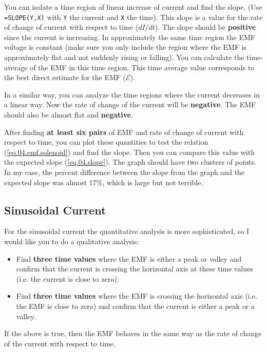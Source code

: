 You can isolate a time region of linear increase of current and find the slope. (Use \texttt{=SLOPE(Y,X)} with \texttt{Y} the current and \texttt{X} the time). This slope is a value for the rate of change of current with respect to time ($dI/dt$). The slope should be \textbf{positive} since the current is increasing. In approximately the same time region the EMF voltage is constant (make sure you only include the region where the EMF is approximately flat and not suddenly rising or falling). You can calculate the time-average of the EMF in this time region. This time average value corresponds to the best direct estimate for the EMF ($\mathcal{E}$).

In a similar way, you can analyze the time regions where the current decreases in a linear way. Now the rate of change of the current will be \textbf{negative}. The EMF should also be almost flat and \textbf{negative}.

After finding \textbf{at least six pairs} of EMF and rate of change of current with respect to time, you can plot these quantities to test the relation (\ref{eq.04.emf.solenoid}) and find the slope. Then you can compare this value with the expected slope (\ref{eq.04.slope}). The graph should have two clusters of points. In my case, the percent difference between the slope from the graph and the expected slope was almost 17\%, which is large but not terrible.
\subsection{Sinusoidal Current}
For the sinusoidal current the quantitative analysis is more sophisticated, so I would like you to do a qualitative analysis:
\begin{itemize}
	\item Find \textbf{three time values} where the EMF is either a peak or valley and confirm that the current is crossing the horizontal axis at these time values (i.e. the current is close to zero).
	\item Find \textbf{three time values} where the EMF is crossing the horizontal axis (i.e. the EMF is close to zero) and confirm that the current is either a peak or a valley.
\end{itemize}
If the above is true, then the EMF behaves in the same way as the rate of change of the current with respect to time.
